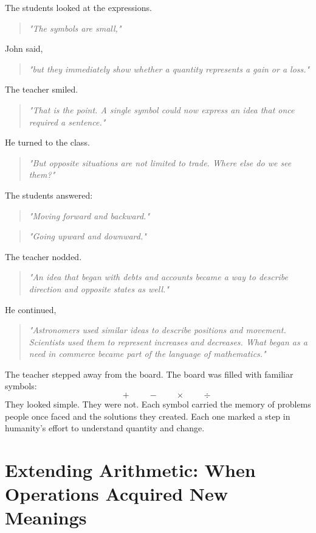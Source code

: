 \documentclass[11pt]{article}
\begin{document}
The students looked at the expressions.
\begin{quote}
\emph{"The symbols are small,"}
\end{quote}
John said,
\begin{quote}
\emph{"but they immediately show whether a quantity represents a gain or a loss."}
\end{quote}
The teacher smiled.
\begin{quote}
\emph{"That is the point. A single symbol could now express an idea that once required a sentence."}
\end{quote}
He turned to the class.
\begin{quote}
\emph{"But opposite situations are not limited to trade. Where else do we see them?"}
\end{quote}
The students answered:
\begin{quote}
\emph{"Moving forward and backward."}
\end{quote}
\begin{quote}
\emph{"Going upward and downward."}
\end{quote}
The teacher nodded.
\begin{quote}
\emph{"An idea that began with debts and accounts became a way to describe direction and opposite states as well."}
\end{quote}
He continued,
\begin{quote}
\emph{"Astronomers used similar ideas to describe positions and movement. Scientists used them to represent increases and decreases. What began as a need in commerce became part of the language of mathematics."}
\end{quote}
The teacher stepped away from the board. The board was filled with familiar symbols:
\[
\qquad
+
\qquad
-
\qquad
\times
\qquad
\div
\]
They looked simple. They were not. Each symbol carried the memory of problems people once faced and the solutions they created. Each one marked a step in humanity’s effort to understand quantity and change.

\section*{\textcolor{tealgreen}{Extending Arithmetic: When Operations Acquired New Meanings}}
\end{document}
